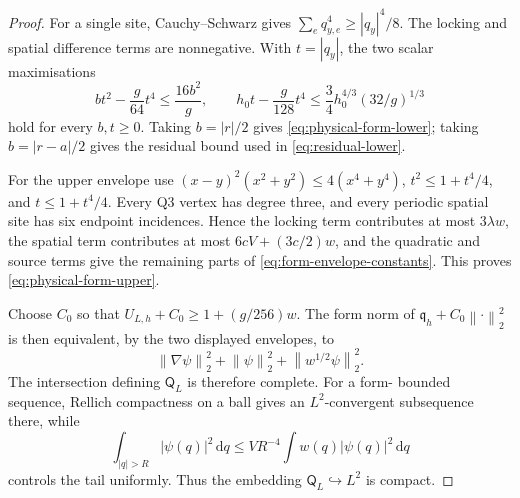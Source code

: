 \documentclass[11pt]{article}
\numberwithin{equation}{section}
\theoremstyle{definition}
\newcommand{\dd}{\,\mathrm d}
\newcommand{\norm}[1]{\left\lVert#1\right\rVert}
\begin{document}
\begin{proof}
For a single site, Cauchy--Schwarz gives
$\sum_e q_{y,e}^4\geq |q_y|^4/8$.  The locking and spatial difference terms
are nonnegative.  With $t=|q_y|$, the two scalar maximisations
\[
 bt^2-\frac{g}{64}t^4\leq\frac{16b^2}{g},\qquad
 h_0t-\frac{g}{128}t^4
 \leq\frac34h_0^{4/3}(32/g)^{1/3}
\]
hold for every $b,t\geq0$.  Taking $b=|r|/2$ gives
\eqref{eq:physical-form-lower}; taking $b=|r-a|/2$ gives the residual bound
used in \eqref{eq:residual-lower}.

For the upper envelope use
$(x-y)^2(x^2+y^2)\leq4(x^4+y^4)$,
$t^2\leq1+t^4/4$, and $t\leq1+t^4/4$.  Every Q3 vertex has degree three,
and every periodic spatial site has six endpoint incidences.  Hence the
locking term contributes at most $3\lambda w$, the spatial term contributes
at most $6cV+(3c/2)w$, and the quadratic and source terms give the remaining
parts of \eqref{eq:form-envelope-constants}.  This proves
\eqref{eq:physical-form-upper}.

Choose $C_0$ so that $U_{L,h}+C_0\geq1+(g/256)w$.  The form norm of
$\mathfrak q_h+C_0\norm{\cdot}_2^2$ is then equivalent, by the two displayed
envelopes, to
\[
 \norm{\nabla\psi}_2^2+\norm{\psi}_2^2+
 \norm{w^{1/2}\psi}_2^2.
\]
The intersection defining $\mathsf Q_L$ is therefore complete.  For a form-
bounded sequence, Rellich compactness on a ball gives an $L^2$-convergent
subsequence there, while
\[
 \int_{|q|>R}|\psi(q)|^2\dd q
 \leq VR^{-4}\int w(q)|\psi(q)|^2\dd q
\]
controls the tail uniformly.  Thus the embedding $\mathsf Q_L\hookrightarrow
L^2$ is compact.


\end{proof}
\end{document}

